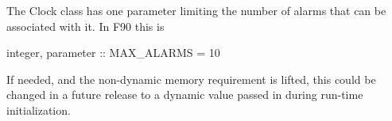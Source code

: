 
The Clock class has one parameter limiting the number of alarms that can be
associated with it.  In F90 this is

        integer, parameter :: MAX\_ALARMS = 10

If needed, and the non-dynamic memory requirement is lifted, this could be
changed in a future release to a dynamic value passed in during run-time
initialization.
